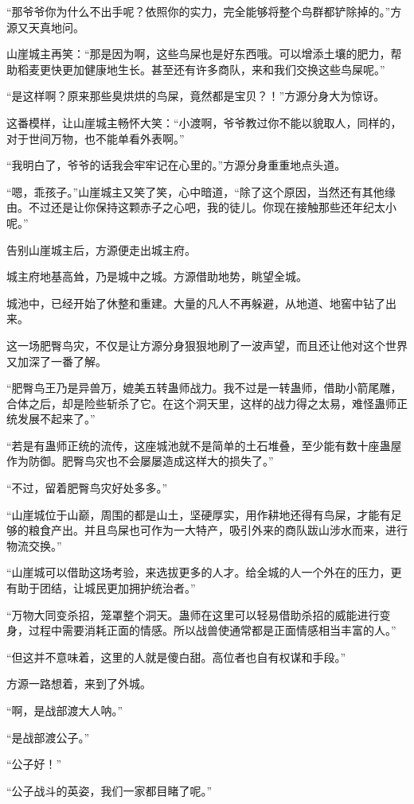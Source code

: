 \begin{this_body}
“那爷爷你为什么不出手呢？依照你的实力，完全能够将整个鸟群都铲除掉的。”方源又天真地问。

山崖城主再笑：“那是因为啊，这些鸟屎也是好东西哦。可以增添土壤的肥力，帮助稻麦更快更加健康地生长。甚至还有许多商队，来和我们交换这些鸟屎呢。”

“是这样啊？原来那些臭烘烘的鸟屎，竟然都是宝贝？！”方源分身大为惊讶。

这番模样，让山崖城主畅怀大笑：“小渡啊，爷爷教过你不能以貌取人，同样的，对于世间万物，也不能单看外表啊。”

“我明白了，爷爷的话我会牢牢记在心里的。”方源分身重重地点头道。

“嗯，乖孩子。”山崖城主又笑了笑，心中暗道，“除了这个原因，当然还有其他缘由。不过还是让你保持这颗赤子之心吧，我的徒儿。你现在接触那些还年纪太小呢。”

告别山崖城主后，方源便走出城主府。

城主府地基高耸，乃是城中之城。方源借助地势，眺望全城。

城池中，已经开始了休整和重建。大量的凡人不再躲避，从地道、地窖中钻了出来。

这一场肥臀鸟灾，不仅是让方源分身狠狠地刷了一波声望，而且还让他对这个世界又加深了一番了解。

“肥臀鸟王乃是异兽万，媲美五转蛊师战力。我不过是一转蛊师，借助小箭尾雕，合体之后，却是险些斩杀了它。在这个洞天里，这样的战力得之太易，难怪蛊师正统发展不起来了。”

“若是有蛊师正统的流传，这座城池就不是简单的土石堆叠，至少能有数十座蛊屋作为防御。肥臀鸟灾也不会屡屡造成这样大的损失了。”

“不过，留着肥臀鸟灾好处多多。”

“山崖城位于山巅，周围的都是山土，坚硬厚实，用作耕地还得有鸟屎，才能有足够的粮食产出。并且鸟屎也可作为一大特产，吸引外来的商队跋山涉水而来，进行物流交换。”

“山崖城可以借助这场考验，来选拔更多的人才。给全城的人一个外在的压力，更有助于团结，让城民更加拥护统治者。”

“万物大同变杀招，笼罩整个洞天。蛊师在这里可以轻易借助杀招的威能进行变身，过程中需要消耗正面的情感。所以战兽使通常都是正面情感相当丰富的人。”

“但这并不意味着，这里的人就是傻白甜。高位者也自有权谋和手段。”

方源一路想着，来到了外城。

“啊，是战部渡大人呐。”

“是战部渡公子。”

“公子好！”

“公子战斗的英姿，我们一家都目睹了呢。”


\end{this_body}
